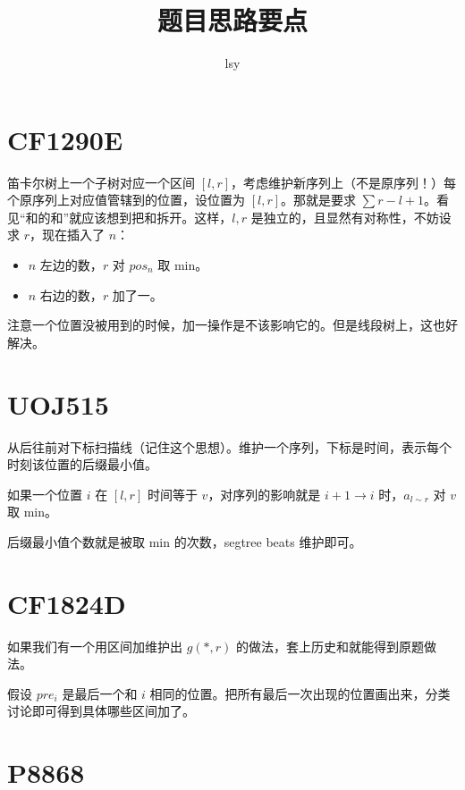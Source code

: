 \documentclass{noithesis}
\begin{document}
\title {题目思路要点}

\author {lsy}

\maketitle


\section{CF1290E}

笛卡尔树上一个子树对应一个区间 $[l,r]$，考虑维护新序列上（不是原序列！）每个原序列上对应值管辖到的位置，设位置为 $[l,r]$。那就是要求 $\sum r-l+1$。看见“和的和”就应该想到把和拆开。这样，$l,r$ 是独立的，且显然有对称性，不妨设求 $r$，现在插入了 $n$：

\begin{itemize}
\item $n$ 左边的数，$r$ 对 $pos_n$ 取 min。
\item $n$ 右边的数，$r$ 加了一。
\end{itemize}

注意一个位置没被用到的时候，加一操作是不该影响它的。但是线段树上，这也好解决。

\section{UOJ515}

从后往前对下标扫描线（记住这个思想）。维护一个序列，下标是时间，表示每个时刻该位置的后缀最小值。

如果一个位置 $i$ 在 $[l,r]$ 时间等于 $v$，对序列的影响就是 $i+1\to i$ 时，$a_{l\sim r}$ 对 $v$ 取 min。

后缀最小值个数就是被取 min 的次数，segtree beats 维护即可。

\section{CF1824D}

如果我们有一个用区间加维护出 $g(*,r)$ 的做法，套上历史和就能得到原题做法。

假设 $pre_i$ 是最后一个和 $i$ 相同的位置。把所有最后一次出现的位置画出来，分类讨论即可得到具体哪些区间加了。

\section{P8868}
\end{document}
